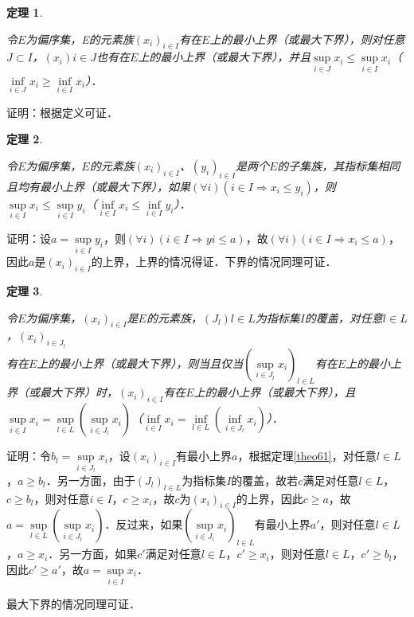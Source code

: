 \documentclass[12pt, a4paper, oneside]{book}
\newtheorem{theo}{定理}
\begin{document}
			\begin{theo}\label{theo62}
				\hfill\par
				令$E$为偏序集，E的元素族$(x_i)_{i\in I}$有在$E$上的最小上界（或最大下界），则对任意$J\subset I$，$(x_i)i\in J$也有在$E$上的最小上界（或最大下界），并且$\mathop{sup}\limits_{i\in J}x_i\leq \mathop{sup}\limits_{i\in I}x_i$（$\mathop{inf}\limits_{i\in J}x_i\geq \mathop{inf}\limits_{i\in I}x_i$）．
			\end{theo}
			证明：根据定义可证．
			
			\begin{theo}\label{theo63}
				\hfill\par
				令$E$为偏序集，$E$的元素族$(x_i)_{i\in I}$、$(y_i)_{i\in I}$是两个$E$的子集族，其指标集相同且均有最小上界（或最大下界），如果$(\forall i)(i\in I\Rightarrow x_i\leq y_i)$，则$\mathop{sup}\limits_{i\in I}x_i\leq \mathop{sup}\limits_{i\in I}y_i$（$\mathop{inf}\limits_{i\in I}x_i\leq \mathop{inf}\limits_{i\in I}y_i$）．
			\end{theo}
			证明：设$a=\mathop{sup}\limits_{i\in I}y_i$，则$(\forall i)(i\in I\Rightarrow yi\leq a)$，故$(\forall i)(i\in I\Rightarrow x_i\leq a)$，因此$a是(x_i)_{i\in I}$的上界，上界的情况得证．下界的情况同理可证．
			
			\begin{theo}\label{theo64}
				\hfill\par
				令$E$为偏序集，$(x_i)_{i\in I}$是$E$的元素族，$(J_l)l\in L$为指标集$I$的覆盖，对任意$l\in L$，$(x_i)_{i\in J_l}$\\有在$E$上的最小上界（或最大下界），则当且仅当$(\mathop{sup}\limits_{i\in J_l}x_i)_{l\in L}$有在$E$上的最小上界（或最大下界）时，$(x_i)_{i\in I}$有在$E$上的最小上界（或最大下界），且$\mathop{sup}\limits_{i\in I}x_i=\mathop{sup}\limits_{l\in L}(\mathop{sup}\limits_{i\in J_l}x_i)$（$\mathop{inf}\limits_{i\in I}x_i=\mathop{inf}\limits_{l\in L}(\mathop{inf}\limits_{i\in J_l}x_i)$）．
			\end{theo}
			证明：令$b_l=\mathop{sup}\limits_{i\in J_l}x_i$，设$(x_i)_{i\in I}$有最小上界$a$，根据定理\ref{theo61}，对任意$l\in L$，$a\geq b_l$．另一方面，由于$(J_l)_{l\in L}$为指标集$I$的覆盖，故若$c$满足对任意$l\in L$，$c\geq b_l$，则对任意$i\in I$，$c\geq x_i$，故$c为(x_i)_{i\in I}$的上界，因此$c\geq a$，故$a= \mathop{sup}\limits_{l\in L}(\mathop{sup}\limits_{i\in J_l}x_i)$．反过来，如果$(\mathop{sup}\limits_{i\in J_l}x_i)_{l\in L}$有最小上界$a'$，则对任意$l\in L$，$a\geq x_i$．另一方面，如果$c'$满足对任意$l\in L$，$c'\geq x_i$，则对任意$l\in L$，$c'\geq b_l$，因此$c' \geq a'$，故$a=\mathop{sup}\limits_{i\in I}x_i$．
			\par
			最大下界的情况同理可证．
			
\end{document}
